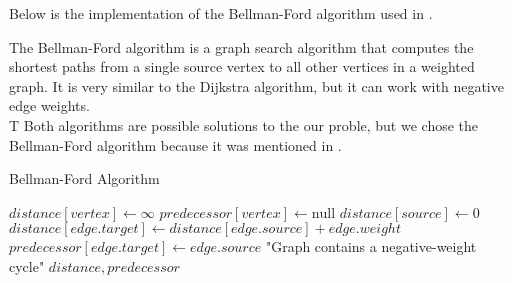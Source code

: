 Below is the implementation of the Bellman-Ford algorithm used in \texttt{}.

The Bellman-Ford algorithm is a graph search algorithm that computes 
the shortest paths from a single source vertex to all other vertices in a weighted graph.
It is very similar to the Dijkstra algorithm, but it can work with negative edge weights.\\T
Both algorithms are possible solutions to the our proble, but we chose the Bellman-Ford algorithm because it was mentioned in \cite{threat_surf}.

\begin{algorithm}[h]
    \caption{Bellman-Ford Algorithm}
    \begin{algorithmic}[1]
            \State $distance[vertex] \gets \infty$
            \State $predecessor[vertex] \gets \text{null}$
        \EndFor
        \State $distance[source] \gets 0$
                    \State $distance[edge.target] \gets distance[edge.source] + edge.weight$
                    \State $predecessor[edge.target] \gets edge.source$
                \EndIf
            \EndFor
        \EndFor
                \State \Return "Graph contains a negative-weight cycle"
            \EndIf
        \EndFor
        \State \Return $distance, predecessor$
    \EndProcedure
    \end{algorithmic}
\end{algorithm}